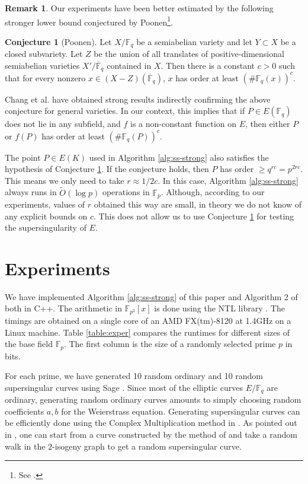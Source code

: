 \documentclass[11pt]{article}
\theoremstyle{plain}
\theoremstyle{definition}
\newtheorem{conjecture}[theorem]{Conjecture}
\newtheorem*{remark}{Remark}
\newcommand{\tildO}{\tilde{O}}
\def\F{\ensuremath{\mathbb{F}}}
\begin{document}
\begin{remark}
	Our experiments have been better estimated by the following stronger lower bound conjectured by 
	Poonen\footnote{See \cite{voloch2007}.}.
	\begin{conjecture}[Poonen]
		\label{conj:poonen}
		Let $X/\F_q$ be a semiabelian variety and let $Y \subset X$ be a closed subvariety. Let $Z$ 
		be the union of all translates of positive-dimensional semiabelian varieties $X' / 
		\overline{\F}_q$ contained in $X$. Then there is a constant $c > 0$ such that for every 
		nonzero $x \in (X - Z)(\overline{\F}_q)$, $x$ has order at least $(\#\F_q(x))^c$.
	\end{conjecture}
	Chang et al.\cite{chang2014} have obtained strong results indirectly confirming the above 
	conjecture for general varieties. In our context, this implies that if $P \in E(\F_q)$ does 
	not lie in any subfield, and $f$ is a non-constant function on $E$, then either $P$ or $f(P)$ 
	has order at least $(\#\F_q(P))^c$. 
	
	The point $P \in E(K)$ used in Algorithm \ref{alg:ss-strong} also satisfies the hypothesis of 
	Conjecture \ref{conj:poonen}. If the conjecture holds, then $P$ has order $\ge q^{rc} = 
	p^{2rc}$. This means we only need to take $r \approx 1 / 2c$. In this case, Algorithm 
	\ref{alg:ss-strong} always runs in $\tildO(\log p)$ operations in $\F_p$. Although, according 
	to our experiments, values of $r$ obtained this way are small, in theory we do not know of any 
	explicit bounds on $c$. This does not allow us to use Conjecture \ref{conj:poonen} for testing 
	the supersingularity of $E$.
\end{remark}




\section{Experiments}
\label{sec:exper}

We have implemented Algorithm \ref{alg:ss-strong} of this paper and Algorithm 2 of 
\cite{sutherland2012} both in C++. The arithmetic in $\F_{p^2}[x]$ is done using the NTL library 
\cite{shoup2001ntl}. The timings are obtained on a single core of an AMD FX(tm)-8120 at 1.4GHz on a 
Linux machine. Table \ref{table:exper} compares the runtimes for different sizes of the base field 
$\F_p$. The first column is the size of a randomly selected prime $p$ in bits. 

For each prime, we have generated 10 random ordinary and 10 random supersingular curves using Sage 
\cite{stein2008sage}. Since most of the elliptic curves $E/\F_q$ are ordinary, generating random 
ordinary curves amounts to simply choosing random coefficients $a, b$ for the Weierstrass equation. 
Generating supersingular curves can be efficiently done using the Complex Multiplication method in 
\cite{broker2009}. As pointed out in \cite{sutherland2012}, one can start from a curve constructed 
by the method of \cite{broker2009} and take a random walk in the $2$-isogeny graph to get a random 
supersingular curve.
\end{document}

